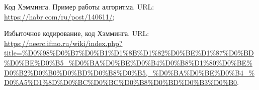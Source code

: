 


\begin{thebibliography}{3}

    Код Хэмминга. Пример работы алгоритма. URL: \url{https://habr.com/ru/post/140611/};

    Избыточное кодирование, код Хэмминга. URL: \url{https://neerc.ifmo.ru/wiki/index.php?title=%D0%98%D0%B7%D0%B1%D1%8B%D1%82%D0%BE%D1%87%D0%BD%D0%BE%D0%B5_%D0%BA%D0%BE%D0%B4%D0%B8%D1%80%D0%BE%D0%B2%D0%B0%D0%BD%D0%B8%D0%B5,_%D0%BA%D0%BE%D0%B4_%D0%A5%D1%8D%D0%BC%D0%BC%D0%B8%D0%BD%D0%B3%D0%B0}.

\end{thebibliography}